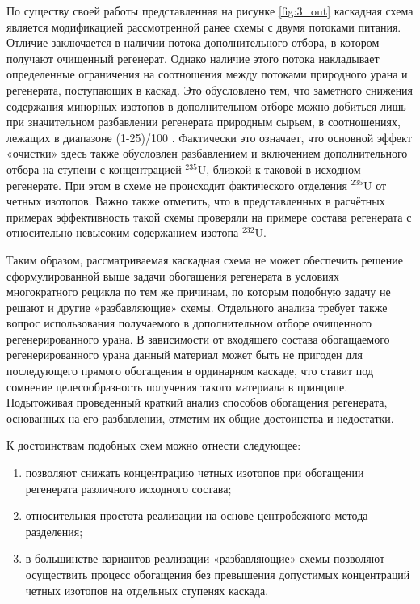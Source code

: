 По существу своей работы представленная на рисунке \ref{fig:3_out} каскадная схема является модификацией рассмотренной ранее схемы с двумя потоками питания. Отличие заключается в наличии потока дополнительного отбора, в котором получают очищенный регенерат. Однако наличие этого потока накладывает определенные ограничения на соотношения между потоками природного урана и регенерата, поступающих в каскад. Это обусловлено тем, что заметного снижения содержания минорных изотопов в дополнительном отборе можно добиться лишь при значительном разбавлении регенерата природным сырьем, в соотношениях, лежащих в диапазоне (1-25)/100 \cite{palkinSeparationUraniumIsotopes2010,smirnovKaskadnyeShemyZadachah2012}. Фактически это означает, что основной эффект «очистки» здесь также обусловлен разбавлением и включением дополнительного отбора на ступени с концентрацией $^{235}$U, близкой к таковой в исходном регенерате. При этом в схеме не происходит фактического отделения $^{235}$U от четных изотопов. Важно также отметить, что в представленных в \cite{palkinSeparationUraniumIsotopes2010} расчётных примерах эффективность такой схемы проверяли на примере состава регенерата с относительно невысоким содержанием изотопа $^{232}$U.

Таким образом, рассматриваемая каскадная схема не может обеспечить решение сформулированной выше задачи обогащения регенерата в условиях многократного рецикла по тем же причинам, по которым подобную задачу не решают и другие «разбавляющие» схемы. Отдельного анализа требует также вопрос использования получаемого в дополнительном отборе очищенного регенерированного урана. В зависимости от входящего состава обогащаемого регенерированного урана данный материал может быть не пригоден для последующего прямого обогащения в ординарном каскаде, что ставит под сомнение целесообразность получения такого материала в принципе.
Подытоживая проведенный краткий анализ способов обогащения регенерата, основанных на его разбавлении, отметим их общие достоинства и недостатки.

К достоинствам подобных схем можно отнести следующее:

\begin{enumerate}
  \item	позволяют снижать концентрацию четных изотопов при обогащении регенерата различного исходного состава;
  \item	относительная простота реализации на основе центробежного метода разделения;
  \item	в большинстве вариантов реализации «разбавляющие» схемы позволяют осуществить процесс обогащения без превышения допустимых концентраций четных изотопов на отдельных ступенях каскада.
\end{enumerate} 


